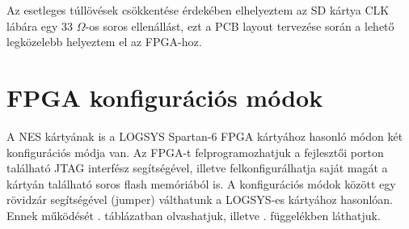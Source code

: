 	Az esetleges túllövések csökkentése érdekében elhelyeztem az SD kártya CLK lábára egy 33 $\Omega$-os soros ellenállást, ezt a PCB layout tervezése során a lehető legközelebb helyeztem el az FPGA-hoz.  
	
\section{FPGA konfigurációs módok}
	
	A NES kártyának is a LOGSYS Spartan-6 FPGA kártyához hasonló módon \cite{spatan6} két konfigurációs módja van. Az FPGA-t felprogramozhatjuk a fejlesztői porton található JTAG interfész segítségével, illetve felkonfigurálhatja saját magát a kártyán található soros flash memóriából is. A konfigurációs módok között egy rövidzár segítségével (jumper) válthatunk a LOGSYS-es kártyához hasonlóan. Ennek működését . táblázatban olvashatjuk, illetve . függelékben láthatjuk.       
	
